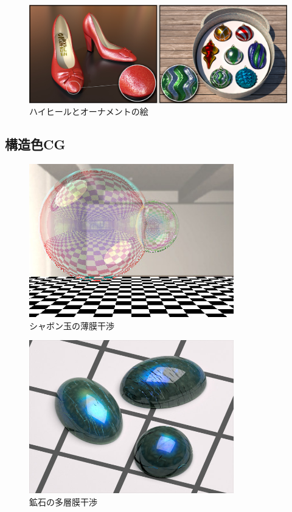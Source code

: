 \begin{figure}[hn]
  \centering
  \includegraphics[width=5.0in]{./img/heel_ornament.jpg}
  \caption{ハイヒールとオーナメントの絵\cite{}}
  \label{F}
\end{figure}


\subsection{構造色CG}

\begin{figure}[htbp]
  \centering
  \includegraphics[width=3.5in]{./img/syabon_iwasaki.jpg}
  \caption{シャボン玉の薄膜干渉\cite{}}
  \label{FSyabon}
\end{figure}

\begin{figure}[htbp]
  \centering
  \includegraphics[width=3.5in]{./img/kouseki_weidlich.jpg}
  \caption{鉱石の多層膜干渉\cite{}}
  \label{FKouseki}
\end{figure}

